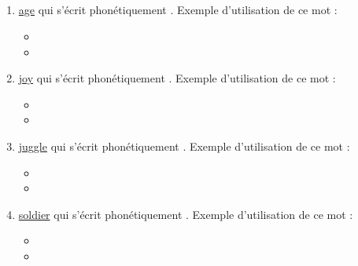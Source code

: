 \subsection{ }
\label{sec:org83b259c}
\begin{enumerate}
\item \href{http://www.wordreference.com/enfr/age}{age} qui s'écrit phonétiquement \href{https://en.oxforddictionaries.com/definition/age}{}. Exemple d'utilisation de ce
mot :
\begin{itemize}
\item{}
\item{}
\end{itemize}
\item \href{http://www.wordreference.com/enfr/joy}{joy} qui s'écrit phonétiquement \href{https://en.oxforddictionaries.com/definition/joy}{}. Exemple d'utilisation de ce
mot :
\begin{itemize}
\item{}
\item{}
\end{itemize}
\item \href{http://www.wordreference.com/enfr/juggle}{juggle} qui s'écrit phonétiquement \href{https://en.oxforddictionaries.com/definition/juggle}{}. Exemple
d'utilisation de ce mot :
\begin{itemize}
\item{}
\item{}
\end{itemize}
\item \href{http://www.wordreference.com/enfr/soldier}{soldier} qui s'écrit phonétiquement \href{https://en.oxforddictionaries.com/definition/soldier}{}. Exemple
d'utilisation de ce mot : 
\begin{itemize}
\item{}
\item{}
\end{itemize}
\end{enumerate}
